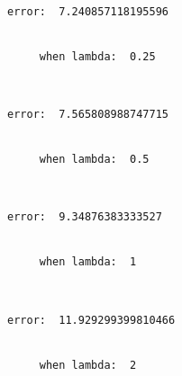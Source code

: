 \documentclass[11pt]{article}
\begin{document}
    \begin{Verbatim}[commandchars=\\\{\}]
     error:  7.240857118195596


     when lambda:  0.25

    \end{Verbatim}

    \begin{center}
    \end{center}
    { \hspace*{\fill} \\}
    
    \begin{Verbatim}[commandchars=\\\{\}]
     error:  7.565808988747715


     when lambda:  0.5

    \end{Verbatim}

    \begin{center}
    \end{center}
    { \hspace*{\fill} \\}
    
    \begin{Verbatim}[commandchars=\\\{\}]
     error:  9.34876383333527


     when lambda:  1

    \end{Verbatim}

    \begin{center}
    \end{center}
    { \hspace*{\fill} \\}
    
    \begin{Verbatim}[commandchars=\\\{\}]
     error:  11.929299399810466


     when lambda:  2

    \end{Verbatim}

    \begin{center}
    \end{center}
    { \hspace*{\fill} \\}
    
\end{document}
